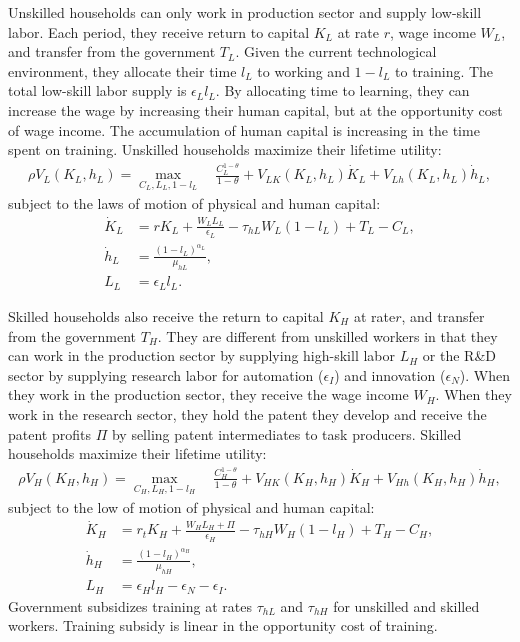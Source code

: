 \documentclass[12pt]{article}
\begin{document}
Unskilled households can only work in production sector and supply low-skill labor. Each period, they receive return to capital $K_L$ at rate $r$, wage income $W_L$, and transfer from the government $T_L$. Given the current technological environment, they allocate their time $l_L$ to working and $1-l_L$ to training. The total low-skill labor supply is $\epsilon_Ll_L$. By allocating time to learning, they can increase the wage by increasing their human capital, but at the opportunity cost of wage income. The accumulation of human capital is increasing in the time spent on training. Unskilled households maximize their lifetime utility: 
\begin{align*}
\rho V_L(K_L,h_L) = \max_{C_L,L_L,1-l_L} \quad \frac{C_L^{1-\theta}}{1-\theta}+V_{LK}(K_L,h_L)\dot{K}_L+V_{Lh}(K_L,h_L)\dot{h}_L,
\end{align*}
subject to the laws of motion of physical and human capital: 
\begin{align*}
\dot{K}_L &=r K_L+\frac{W_LL_L}{\epsilon_L}-\tau_{hL}W_L(1-l_L)+T_L-C_L, \\
\dot{h}_L &= \frac{(1-l_L)^{\alpha_L}}{\mu_{hL}}, \\
L_L &=\epsilon_L l_L.
\end{align*}

Skilled households also receive the return to capital $K_H$ at rate$r$, and transfer from the government $T_H$. They are different from unskilled workers in that they can work in the production sector by supplying high-skill labor $L_H$ or the R\&D sector by supplying research labor for automation ($\epsilon_I$) and innovation ($\epsilon_N$). When they work in the production sector, they receive the wage income $W_H$. When they work in the research sector, they hold the patent they develop and receive the patent profits $\Pi$ by selling patent intermediates to task producers. Skilled households maximize their lifetime utility: 
\begin{align*}
\rho V_H(K_H,h_H) = \max_{C_H,L_H,1-l_H} \quad \frac{C_H^{1-\theta}}{1-\theta}+V_{HK}(K_H,h_H)\dot{K}_H+V_{Hh}(K_H,h_H)\dot{h}_H,
\end{align*}
subject to the low of motion of physical and human capital: 
\begin{align*}
\dot{K}_H &= r_t K_H +\frac{W_H L_H+\Pi}{\epsilon_H}-\tau_{hH}W_H(1-l_H)+T_H-C_H, \\
\dot{h}_H &= \frac{(1-l_H)^{\alpha_H}}{\mu_{hH}}, \\
 L_H&=\epsilon_H l_H-\epsilon_N-\epsilon_I.
\end{align*}
Government subsidizes training at rates $\tau_{hL}$ and $\tau_{hH}$ for unskilled and skilled workers. Training subsidy is linear in the opportunity cost of training. 
\end{document}
